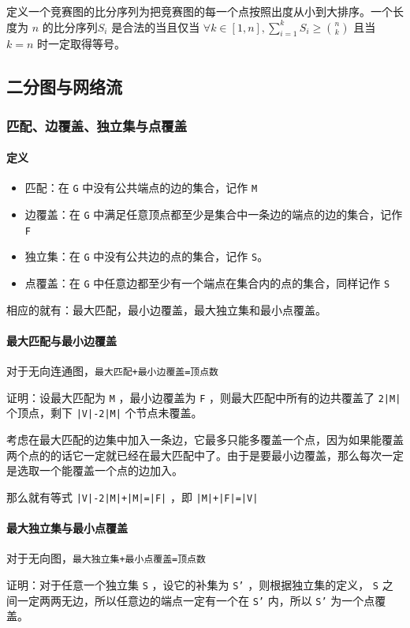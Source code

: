 \documentclass[UTF-8]{ctexart}
\begin{document}
	定义一个竞赛图的比分序列为把竞赛图的每一个点按照出度从小到大排序。一个长度为 $n$ 的比分序列$S_i$ 是合法的当且仅当 $\forall k\in[1,n],\sum_{i=1}^kS_i\ge\binom{n}{k}$ 且当 $k=n$ 时一定取得等号。
	
	\subsection{二分图与网络流}
	\subsubsection{匹配、边覆盖、独立集与点覆盖}
	\paragraph{定义}
	\begin{itemize}
		\item 匹配：在 \texttt{G} 中没有公共端点的边的集合，记作 \texttt{M}
		\item 边覆盖：在 \texttt{G} 中满足任意顶点都至少是集合中一条边的端点的边的集合，记作 \texttt{F}
		\item 独立集：在 \texttt{G} 中没有公共边的点的集合，记作 \texttt{S}。
		\item 点覆盖：在 \texttt{G} 中任意边都至少有一个端点在集合内的点的集合，同样记作 \texttt{S}
	\end{itemize}
	相应的就有：最大匹配，最小边覆盖，最大独立集和最小点覆盖。
	\paragraph{最大匹配与最小边覆盖} 对于无向连通图，\texttt{最大匹配+最小边覆盖=顶点数}
	
	证明：设最大匹配为 \texttt{M} ，最小边覆盖为 \texttt{F} ，则最大匹配中所有的边共覆盖了 \texttt{2|M|} 个顶点，剩下 \texttt{|V|-2|M|} 个节点未覆盖。
	
	考虑在最大匹配的边集中加入一条边，它最多只能多覆盖一个点，因为如果能覆盖两个点的的话它一定就已经在最大匹配中了。由于是要最小边覆盖，那么每次一定是选取一个能覆盖一个点的边加入。
	
	那么就有等式 \texttt{|V|-2|M|+|M|=|F|} ，即 \texttt{|M|+|F|=|V|}
	
	\paragraph{最大独立集与最小点覆盖} 对于无向图，\texttt{最大独立集+最小点覆盖=顶点数}
	
	证明：对于任意一个独立集 \texttt{S} ，设它的补集为 \texttt{S'} ，则根据独立集的定义， \texttt{S} 之间一定两两无边，所以任意边的端点一定有一个在 \texttt{S'} 内，所以 \texttt{S'} 为一个点覆盖。
	
\end{document}
